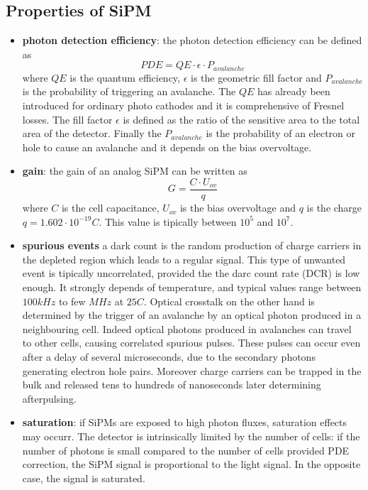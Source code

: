 \subsection{Properties of SiPM}
\begin{itemize}
\item \textbf{photon detection efficiency}: the photon detection efficiency can be defined as
\begin{equation}
PDE = QE \cdot \epsilon \cdot P_{avalanche}
\end{equation}
where $QE$ is the quantum efficiency, $\epsilon$ is the geometric fill factor and $P_{avalanche}$ is the probability of triggering an avalanche.
The $QE$ has already been introduced for ordinary photo cathodes and it is comprehensive of Fresnel losses.
The fill factor $\epsilon$ is defined as the ratio of the sensitive area to the total area of the detector.
Finally the $P_{avalanche}$ is the probability of an electron or hole to cause an avalanche and it depends on the bias overvoltage.

\item \textbf{gain}: the gain of an analog SiPM can be written as
\begin{equation}
G = \frac{C\cdot U_{ov}}{q}
\end{equation}
where $C$ is the cell capacitance, $U_{ov}$ is the bias overvoltage and $q$ is the charge $q = 1.602 \cdot 10^{-19} C$.
This value is tipically between $10^{5}$ and $10^{7}$.

\item \textbf{spurious events} a dark count is the random production of charge carriers in the depleted region which leads to a regular signal. This type of unwanted event is tipically uncorrelated, provided the the darc count rate (DCR) is low enough. It strongly depends of temperature, and typical values range between $100kHz$ to few $MHz$ at $25C$.
Optical crosstalk on the other hand is determined by the trigger of an avalanche by an optical photon produced in a neighbouring cell. Indeed optical photons produced in avalanches can travel to other cells, causing correlated spurious pulses. These pulses can occur even after a delay of several microseconds, due to the secondary photons generating electron hole pairs.
Moreover charge carriers can be trapped in the bulk and released tens to hundreds of nanoseconds later determining afterpulsing.

\item \textbf{saturation}: if SiPMs are exposed to high photon fluxes, saturation effects may occurr. The detector is intrinsically limited by the number of cells: if the number of photons is small compared to the number of cells provided PDE correction, the SiPM signal is proportional to the light signal. In the opposite case, the signal is saturated.
\end{itemize}

